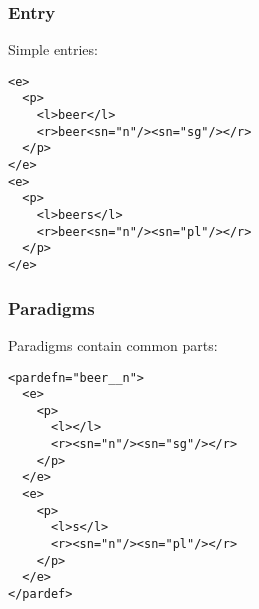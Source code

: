 \documentclass{beamer} %
\begin{document}
\begin{frame}
  \frametitle{Entry}

  \begin{exampleblock}{Simple entries:}
    \begin{footnotesize}
    \begin{alltt}
      <e> \\
      ~~<p> \\
      ~~~~<l>beer</l> \\
      ~~~~<r>beer<s n="n"/><s n="sg"/></r> \\
      ~~</p> \\
      </e> \\
      <e> \\
      ~~<p> \\
      ~~~~<l>beers</l> \\
      ~~~~<r>beer<s n="n"/><s n="pl"/></r> \\
      ~~</p> \\
      </e>
    \end{alltt}
    \end{footnotesize}
\end{exampleblock}
\end{frame}

\begin{frame}
  \frametitle{Paradigms}

  \begin{exampleblock}{Paradigms contain common parts:}
    \begin{footnotesize}
    \begin{alltt}
      <pardef n="beer\_\_n"> \\
      ~~<e> \\
      ~~~~<p> \\
      ~~~~~~<l></l> \\
      ~~~~~~<r><s n="n"/><s n="sg"/></r> \\
      ~~~~</p> \\
      ~~</e> \\
      ~~<e> \\
      ~~~~<p> \\
      ~~~~~~<l>s</l> \\
      ~~~~~~<r><s n="n"/><s n="pl"/></r> \\
      ~~~~</p> \\
      ~~</e> \\
      </pardef>
    \end{alltt}
    \end{footnotesize}
\end{exampleblock}
\end{frame}
\end{document}
